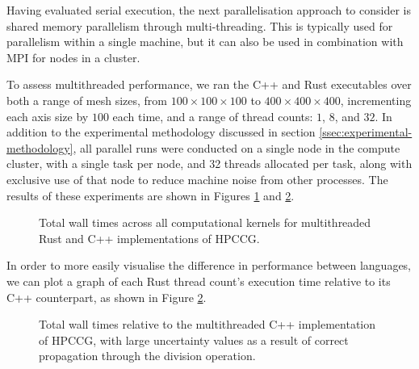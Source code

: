 Having evaluated serial execution, the next parallelisation approach to consider is shared memory parallelism through multi-threading. This is typically used for parallelism within a single machine, but it can also be used in combination with MPI for nodes in a cluster.

To assess multithreaded performance, we ran the C++ and Rust executables over both a range of mesh sizes, from $100 \times 100 \times 100$ to $400 \times 400 \times 400$, incrementing each axis size by $100$ each time, and a range of thread counts: $1$, $8$, and $32$. In addition to the experimental methodology discussed in section \ref{ssec:experimental-methodology}, all parallel runs were conducted on a single node in the compute cluster, with a single task per node, and 32 threads allocated per task, along with exclusive use of that node to reduce machine noise from other processes.
The results of these experiments are shown in Figures \ref{fig:5_parallel_line_all} and \ref{fig:7_parallel_line_relative}.

\begin{figure}[H]
    \centering
    \fbox{}
    \captionsetup{skip=0pt}
    \caption{Total wall times across all computational kernels for multithreaded Rust and C++ implementations of \acrshort{HPCCG}.}
    \label{fig:5_parallel_line_all}
\end{figure}

In order to more easily visualise the difference in performance between languages, we can plot a graph of each Rust thread count's execution time relative to its C++ counterpart, as shown in Figure \ref{fig:7_parallel_line_relative}.

\begin{figure}[H]
    \centering
    \fbox{}
    \captionsetup{skip=0pt}
    \caption{Total wall times relative to the multithreaded C++ implementation of \acrshort{HPCCG}, with large uncertainty values as a result of correct propagation through the division operation.}
    \label{fig:7_parallel_line_relative}
\end{figure}

